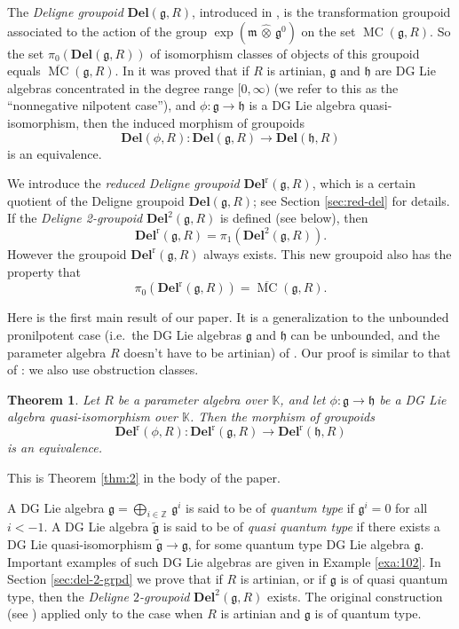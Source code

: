 \documentclass[a4paper,10pt]{amsart}
\newtheorem{thm}[equation]{Theorem}
\theoremstyle{definition}
\numberwithin{equation}{section}
\newcommand{\opn}{\operatorname}
\newcommand{\ol}{\overline}
\newcommand{\mfrak}[1]{\mathfrak{#1}}
\newcommand{\mbf}[1]{\mathbf{#1}}
\newcommand{\mrm}[1]{\mathrm{#1}}
\newcommand{\mbb}[1]{\mathbb{#1}}
\newcommand{\til}[1]{\tilde{#1}}
\newcommand{\what}[1]{\widehat{#1}}
\newcommand{\hatotimes}{\, \what{\otimes} \,}
\newcommand{\hot}{\hatotimes}
\newcommand{\K}{\mbb{K}}
\newcommand{\Z}{\mbb{Z}}
\newcommand{\g}{\mfrak{g}}
\newcommand{\m}{\mfrak{m}}
\newcommand{\h}{\mfrak{h}}
\newcommand{\lb}{\linebreak}
\begin{document}
The {\em Deligne groupoid} $\mbf{Del}(\g, R)$, introduced in \cite{GM}, is the
transformation \lb groupoid associated to the action of the group 
$\opn{exp}(\m \hot \g^0)$ on the set $\opn{MC}(\g, R)$. So the set 
$\pi_0 (\mbf{Del}(\g, R))$ of isomorphism classes of objects of this
groupoid equals $\ol{\opn{MC}}(\g, R)$. 
In \cite[Theorem 2.4]{GM} it was proved that if $R$ is artinian, $\g$ and $\h$
are DG Lie algebras concentrated in the degree range $[0, \infty)$
(we refer to this as the ``nonnegative nilpotent case''), and 
$\phi : \g \to \h$ is a DG Lie algebra quasi-isomorphism, then the induced
morphism of groupoids 
\[ \mbf{Del}(\phi, R) : \mbf{Del}(\g, R) \to \mbf{Del}(\h, R) \]
is an equivalence.

We introduce the {\em reduced Deligne groupoid} 
$\mbf{Del}^{\mrm{r}}(\g, R)$,
which is a certain quotient of the Deligne groupoid $\mbf{Del}(\g, R)$;
see Section \ref{sec:red-del} for details. 
If the {\em Deligne 2-groupoid} $\mbf{Del}^{2}(\g, R)$ is defined 
(see below), then 
\begin{equation} \label{eqn:109}
\mbf{Del}^{\mrm{r}}(\g, R) = 
\pi_1 (\mbf{Del}^{2}(\g, R)) .
\end{equation}
However the groupoid $\mbf{Del}^{\mrm{r}}(\g, R)$ always exists. 
This new groupoid also has the property that 
\[ \pi_0 (\mbf{Del}^{\mrm{r}}(\g, R)) = \ol{\opn{MC}}(\g, R) . \]

Here is the first main result of our paper. It is a generalization to the
unbounded pronilpotent case (i.e.\ the DG Lie algebras $\g$ and $\h$ can be
unbounded, and the parameter algebra $R$ doesn't have to be artinian) of
\cite[Theorem 2.4]{GM}. Our proof is similar to that of \cite[Theorem 2.4]{GM}:
we also use obstruction classes. 

\begin{thm} \label{thm:4}
Let $R$ be a parameter algebra over $\K$, and let $\phi : \g \to \h$ be a
DG Lie algebra quasi-isomorphism over $\K$. Then the morphism of groupoids
\[ \mbf{Del}^{\mrm{r}}(\phi, R) : \mbf{Del}^{\mrm{r}}(\g, R) 
\to \mbf{Del}^{\mrm{r}}(\h, R)  \]
is an equivalence. 
\end{thm}

This is Theorem \ref{thm:2} in the body of the paper. 

A DG Lie algebra $\g =  \bigoplus_{i \in \Z}\, \g^i$ is said to be 
of {\em quantum type} if $\g^i = 0$ for all $i < -1$. A DG Lie algebra 
$\til{\g}$ is said to be of {\em quasi quantum type} if 
there exists a DG Lie quasi-isomorphism $\til{\g} \to \g$, for some 
quantum type DG Lie algebra $\g$. 
Important examples of such DG Lie algebras are given in Example \ref{exa:102}.
In Section \ref{sec:del-2-grpd} we prove that if $R$ is artinian, or if
$\g$ is of quasi quantum type, then the {\em Deligne $2$-groupoid} 
$\mbf{Del}^2(\g, R)$ exists. The original construction (see \cite{Ge}) applied
only to the case when $R$ is artinian and $\g$ is of quantum type. 
\end{document}

